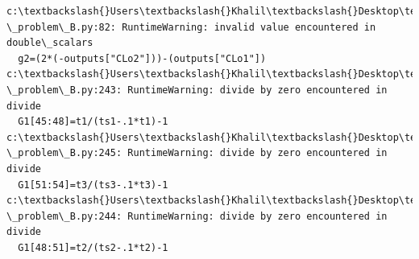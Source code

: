 \documentclass[11pt]{article}
\begin{document}
    \begin{Verbatim}[commandchars=\\\{\}]
c:\textbackslash{}Users\textbackslash{}Khalil\textbackslash{}Desktop\textbackslash{}Documents\textbackslash{}MECH\_559\_material\textbackslash{}MECH559\_notebooks\textbackslash{}10\_mdo\textbackslash{}SBJ
\_problem\_B.py:82: RuntimeWarning: invalid value encountered in double\_scalars
  g2=(2*(-outputs["CLo2"]))-(outputs["CLo1"])
c:\textbackslash{}Users\textbackslash{}Khalil\textbackslash{}Desktop\textbackslash{}Documents\textbackslash{}MECH\_559\_material\textbackslash{}MECH559\_notebooks\textbackslash{}10\_mdo\textbackslash{}SBJ
\_problem\_B.py:243: RuntimeWarning: divide by zero encountered in divide
  G1[45:48]=t1/(ts1-.1*t1)-1
c:\textbackslash{}Users\textbackslash{}Khalil\textbackslash{}Desktop\textbackslash{}Documents\textbackslash{}MECH\_559\_material\textbackslash{}MECH559\_notebooks\textbackslash{}10\_mdo\textbackslash{}SBJ
\_problem\_B.py:245: RuntimeWarning: divide by zero encountered in divide
  G1[51:54]=t3/(ts3-.1*t3)-1
c:\textbackslash{}Users\textbackslash{}Khalil\textbackslash{}Desktop\textbackslash{}Documents\textbackslash{}MECH\_559\_material\textbackslash{}MECH559\_notebooks\textbackslash{}10\_mdo\textbackslash{}SBJ
\_problem\_B.py:244: RuntimeWarning: divide by zero encountered in divide
  G1[48:51]=t2/(ts2-.1*t2)-1
    \end{Verbatim}
\end{document}
